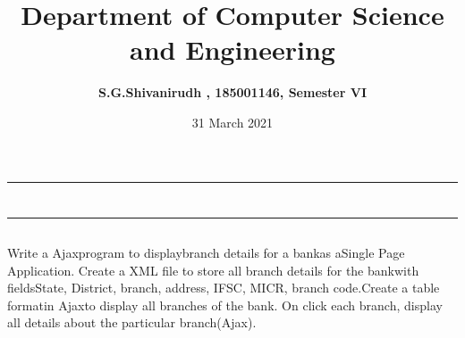 \documentclass[12pt,letterpaper]{article}
\title{\textbf{Department of Computer Science and Engineering}}
\author{\textbf{S.G.Shivanirudh , 185001146, Semester VI }}
\date{31 March 2021}
\begin{document}
\maketitle
\hrule
\section*{}
\hrule 
\bigskip\bigskip

\subsection*{}

\subsection*{}
\begin{flushleft}
    Write a Ajaxprogram to displaybranch details for a bankas aSingle Page Application. Create a XML file to store all branch details for the bankwith fieldsState, District, branch, address, IFSC, MICR, branch code.Create a table formatin Ajaxto display all branches of the bank. On click each branch,  display all details about the particular branch(Ajax).
\end{flushleft}

\subsection*{}
\subsubsection*{}
\begin{flushleft}

\end{flushleft}

\subsubsection*{}
\begin{flushleft}

\end{flushleft}

\newpage
\end{document}
